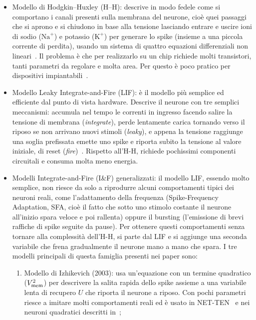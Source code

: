 \begin{itemize}
  \item Modello di Hodgkin--Huxley (H--H): descrive in modo fedele come si comportano i canali presenti sulla membrana del neurone, cioè quei passaggi che si aprono e si chiudono in base alla tensione lasciando entrare e uscire ioni di sodio ($\mathrm{Na}^+$) e potassio ($\mathrm{K}^+$) per generare lo spike (insieme a una piccola corrente di perdita), usando un sistema di quattro equazioni differenziali non lineari~\cite{indiveri2011}. Il problema è che per realizzarlo su un chip richiede molti transistori, tanti parametri da regolare e molta area. Per questo è poco pratico per dispositivi impiantabili~\cite{indiveri2011}.
  \item Modello Leaky Integrate-and-Fire (LIF): è il modello più semplice ed efficiente dal punto di vista hardware. Descrive il neurone con tre semplici meccanismi: accumula nel tempo le correnti in ingresso facendo salire la tensione di membrana (\emph{integrate}), perde lentamente carica tornando verso il riposo se non arrivano nuovi stimoli (\emph{leaky}), e appena la tensione raggiunge una soglia prefissata emette uno spike e riporta subito la tensione al valore iniziale, di reset (\emph{fire})~\cite{indiveri2011, li2024}. Rispetto all'H-H, richiede pochissimi componenti circuitali e consuma molta meno energia.
  \item Modelli Integrate-and-Fire (I\&F) generalizzati: il modello LIF, essendo molto semplice, non riesce da solo a riprodurre alcuni comportamenti tipici dei neuroni reali, come l'adattamento della frequenza (Spike-Frequency Adaptation, SFA, cioè il fatto che sotto uno stimolo costante il neurone all'inizio spara veloce e poi rallenta) oppure il bursting (l'emissione di brevi raffiche di spike seguite da pause). Per ottenere questi comportamenti senza tornare alla complessità dell'H-H, si parte dal LIF e si aggiunge una seconda variabile che frena gradualmente il neurone mano a mano che spara. I tre modelli principali di questa famiglia presenti nei paper sono:
  \begin{enumerate}[label=(\alph*)]
    \item Modello di Izhikevich (2003): usa un'equazione con un termine quadratico ($V_{\mathrm{mem}}^2$) per descrivere la salita rapida dello spike assieme a una variabile lenta di recupero $U$ che riporta il neurone a riposo. Con pochi parametri riesce a imitare molti comportamenti reali ed è usato in NET-TEN~\cite{ronchini2023} e nei neuroni quadratici descritti in~\cite{indiveri2011};

\end{enumerate}
\end{itemize}
